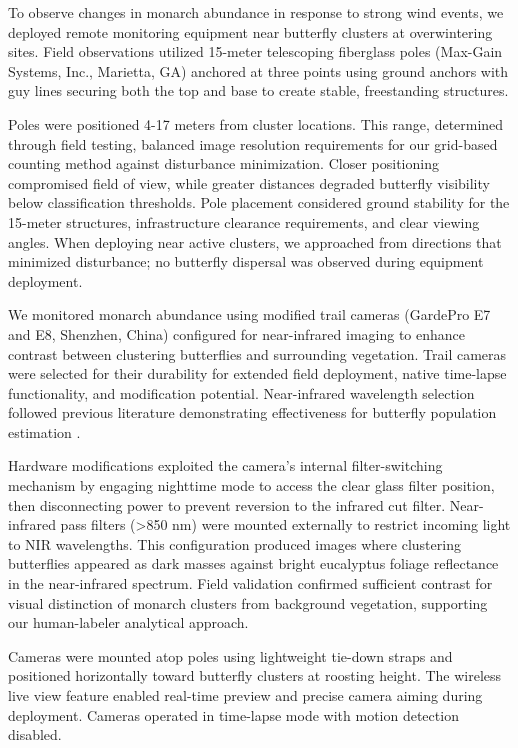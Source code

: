 To observe changes in monarch abundance in response to strong wind events, we deployed remote monitoring equipment near butterfly clusters at overwintering sites. Field observations utilized 15-meter telescoping fiberglass poles (Max-Gain Systems, Inc., Marietta, GA) anchored at three points using ground anchors with guy lines securing both the top and base to create stable, freestanding structures. 

Poles were positioned 4-17 meters from cluster locations. This range, determined through field testing, balanced image resolution requirements for our grid-based counting method against disturbance minimization. Closer positioning compromised field of view, while greater distances degraded butterfly visibility below classification thresholds. Pole placement considered ground stability for the 15-meter structures, infrastructure clearance requirements, and clear viewing angles. When deploying near active clusters, we approached from directions that minimized disturbance; no butterfly dispersal was observed during equipment deployment. 

We monitored monarch abundance using modified trail cameras (GardePro E7 and E8, Shenzhen, China) configured for near-infrared imaging to enhance contrast between clustering butterflies and surrounding vegetation. Trail cameras were selected for their durability for extended field deployment, native time-lapse functionality, and modification potential. Near-infrared wavelength selection followed previous literature demonstrating effectiveness for butterfly population estimation \parencite{hristovEstimatingOverwinteringMonarch2019}. 

Hardware modifications exploited the camera's internal filter-switching mechanism by engaging nighttime mode to access the clear glass filter position, then disconnecting power to prevent reversion to the infrared cut filter. Near-infrared pass filters (>850 nm) were mounted externally to restrict incoming light to NIR wavelengths. This configuration produced images where clustering butterflies appeared as dark masses against bright eucalyptus foliage reflectance in the near-infrared spectrum. Field validation confirmed sufficient contrast for visual distinction of monarch clusters from background vegetation, supporting our human-labeler analytical approach.

Cameras were mounted atop poles using lightweight tie-down straps and positioned horizontally toward butterfly clusters at roosting height. The wireless live view feature enabled real-time preview and precise camera aiming during deployment. Cameras operated in time-lapse mode with motion detection disabled. 

